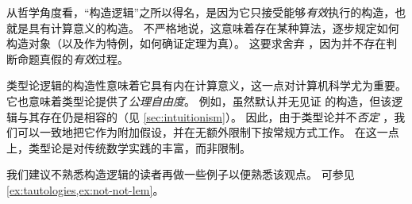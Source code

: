 从哲学角度看，“构造逻辑”之所以得名，是因为它只接受能够\emph{有效}执行的构造，也就是具有计算意义的构造。
不严格地说，这意味着存在某种算法，逐步规定如何构造对象（以及作为特例，如何确证定理为真）。
这要求舍弃 \LEM{}，因为并不存在判断命题真假的\emph{有效}过程。

类型论逻辑的构造性意味着它具有内在计算意义，这一点对计算机科学尤为重要。
它也意味着类型论提供了\emph{公理自由度}。
例如，虽然默认并无见证 \LEM{} 的构造，但该逻辑与其存在仍是相容的（见 \cref{sec:intuitionism}）。
因此，由于类型论并不\emph{否定} \LEM{}，我们可以一致地把它作为附加假设，并在无额外限制下按常规方式工作。
在这一点上，类型论是对传统数学实践的丰富，而非限制。

我们建议不熟悉构造逻辑的读者再做一些例子以便熟悉该观点。
可参见 \cref{ex:tautologies,ex:not-not-lem}。

\mentalpause

